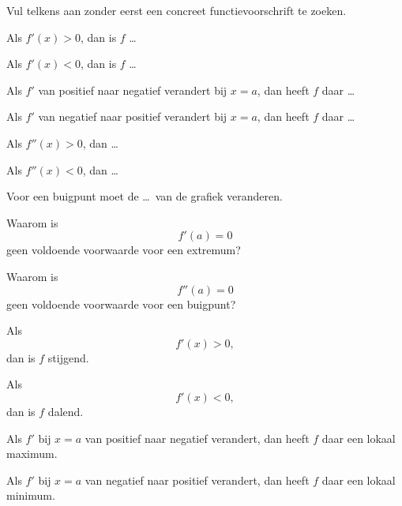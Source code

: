 \documentclass{ximera}
\begin{document}
\begin{oefening}{\oefU\ESS}

Vul telkens aan zonder eerst een concreet functievoorschrift te zoeken.

\begin{question}
Als $f'(x)>0$, dan is $f$ \ldots
\end{question}

\begin{question}
Als $f'(x)<0$, dan is $f$ \ldots
\end{question}

\begin{question}
Als $f'$ van positief naar negatief verandert bij $x=a$,
dan heeft $f$ daar \ldots
\end{question}

\begin{question}
Als $f'$ van negatief naar positief verandert bij $x=a$,
dan heeft $f$ daar \ldots
\end{question}

\begin{question}
Als $f''(x)>0$, dan \ldots
\end{question}

\begin{question}
Als $f''(x)<0$, dan \ldots
\end{question}

\begin{question}
Voor een buigpunt moet de \ldots\ van de grafiek veranderen.
\end{question}

\begin{question}
Waarom is
\[
f'(a)=0
\]
geen voldoende voorwaarde voor een extremum?
\end{question}

\begin{question}
Waarom is
\[
f''(a)=0
\]
geen voldoende voorwaarde voor een buigpunt?
\end{question}

\begin{oplossing}

Als
\[
f'(x)>0,
\]
dan is $f$ stijgend.

Als
\[
f'(x)<0,
\]
dan is $f$ dalend.

Als $f'$ bij $x=a$ van positief naar negatief verandert, dan heeft $f$
daar een lokaal maximum.

Als $f'$ bij $x=a$ van negatief naar positief verandert, dan heeft $f$
daar een lokaal minimum.


\end{oplossing}
\end{oefening}
\end{document}
